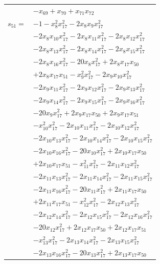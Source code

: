 \begin{longtable}{@{}r@{\;}l@{}}
 & \(\displaystyle -x_{69} +x_{70} +x_{71}x_{72}\) \\[3pt]
\(s_{51}=\) & \(\displaystyle -1 -x_{8}^{2}x_{17}^{2} -2x_{8}x_{9}x_{17}^{2}\) \\
 & \(\displaystyle -2x_{8}x_{10}x_{17}^{2} -2x_{8}x_{11}x_{17}^{2} -2x_{8}x_{12}x_{17}^{2}\) \\
 & \(\displaystyle -2x_{8}x_{13}x_{17}^{2} -2x_{8}x_{14}x_{17}^{2} -2x_{8}x_{15}x_{17}^{2}\) \\
 & \(\displaystyle -2x_{8}x_{16}x_{17}^{2} -20x_{8}x_{17}^{2} +2x_{8}x_{17}x_{50}\) \\
 & \(\displaystyle +2x_{8}x_{17}x_{51} -x_{9}^{2}x_{17}^{2} -2x_{9}x_{10}x_{17}^{2}\) \\
 & \(\displaystyle -2x_{9}x_{11}x_{17}^{2} -2x_{9}x_{12}x_{17}^{2} -2x_{9}x_{13}x_{17}^{2}\) \\
 & \(\displaystyle -2x_{9}x_{14}x_{17}^{2} -2x_{9}x_{15}x_{17}^{2} -2x_{9}x_{16}x_{17}^{2}\) \\
 & \(\displaystyle -20x_{9}x_{17}^{2} +2x_{9}x_{17}x_{50} +2x_{9}x_{17}x_{51}\) \\
 & \(\displaystyle -x_{10}^{2}x_{17}^{2} -2x_{10}x_{11}x_{17}^{2} -2x_{10}x_{12}x_{17}^{2}\) \\
 & \(\displaystyle -2x_{10}x_{13}x_{17}^{2} -2x_{10}x_{14}x_{17}^{2} -2x_{10}x_{15}x_{17}^{2}\) \\
 & \(\displaystyle -2x_{10}x_{16}x_{17}^{2} -20x_{10}x_{17}^{2} +2x_{10}x_{17}x_{50}\) \\
 & \(\displaystyle +2x_{10}x_{17}x_{51} -x_{11}^{2}x_{17}^{2} -2x_{11}x_{12}x_{17}^{2}\) \\
 & \(\displaystyle -2x_{11}x_{13}x_{17}^{2} -2x_{11}x_{14}x_{17}^{2} -2x_{11}x_{15}x_{17}^{2}\) \\
 & \(\displaystyle -2x_{11}x_{16}x_{17}^{2} -20x_{11}x_{17}^{2} +2x_{11}x_{17}x_{50}\) \\
 & \(\displaystyle +2x_{11}x_{17}x_{51} -x_{12}^{2}x_{17}^{2} -2x_{12}x_{13}x_{17}^{2}\) \\
 & \(\displaystyle -2x_{12}x_{14}x_{17}^{2} -2x_{12}x_{15}x_{17}^{2} -2x_{12}x_{16}x_{17}^{2}\) \\
 & \(\displaystyle -20x_{12}x_{17}^{2} +2x_{12}x_{17}x_{50} +2x_{12}x_{17}x_{51}\) \\
 & \(\displaystyle -x_{13}^{2}x_{17}^{2} -2x_{13}x_{14}x_{17}^{2} -2x_{13}x_{15}x_{17}^{2}\) \\
 & \(\displaystyle -2x_{13}x_{16}x_{17}^{2} -20x_{13}x_{17}^{2} +2x_{13}x_{17}x_{50}\) \\

\end{longtable}
